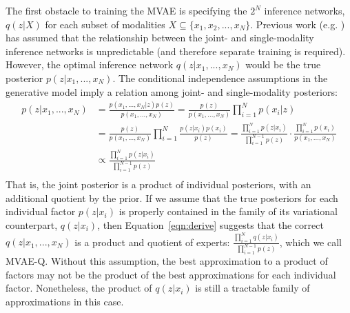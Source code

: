 The first obstacle to training the MVAE is specifying the $2^N$ inference networks, $q(z|X)$ for each subset of modalities $X \subseteq \{x_1, x_2, ..., x_N\}$.
Previous work (e.g. \cite{suzuki2016joint, vedantam2017generative}) has assumed that the relationship between the joint- and single-modality inference networks is unpredictable (and therefore separate training is required).
However, the optimal inference network $q(z|x_1, ..., x_N)$ would be the true posterior $p(z|x_1, ..., x_N)$.
The conditional independence assumptions in the generative model imply a relation among joint- and single-modality posteriors:
\begin{equation}
\begin{aligned}
p(z|x_1, ..., x_N) & = \frac{p(x_1, ..., x_N|z)p(z)}{p(x_1, ..., x_N)} =  \frac{p(z)}{p(x_1, ..., x_N)}\prod_{i=1}^{N} p(x_i|z) \\
& = \frac{p(z)}{p(x_1, ..., x_N)}\prod_{i=1}^{N} \frac{p(z|x_i)p(x_i)}{p(z)}
 = \frac{\prod_{i=1}^{N}p(z|x_i)}{\prod_{i=1}^{N-1}p(z)} \cdot \frac{\prod_{i=1}^{N} p(x_i)}{p(x_1, ..., x_N)} \\
 &\propto \frac{\prod_{i=1}^{N}p(z|x_i)}{\prod_{i=1}^{N-1}p(z)} \\
\end{aligned}
\label{eqn:derive}
\end{equation}
That is, the joint posterior is a product of individual posteriors, with an additional quotient by the prior. If we assume that the true posteriors for each individual factor $p(z|x_i)$ is properly contained in the family of its variational counterpart, $q(z|x_i)$, then Equation~\ref{eqn:derive} suggests that the correct $q(z|x_1, ..., x_N)$ is a product and quotient of experts: $\frac{\prod_{i=1}^{N}q(z|x_i)}{\prod_{i=1}^{N-1}p(z)}$, which we call MVAE-Q. Without this assumption, the best approximation to a product of factors may not be the product of the best approximations for each individual factor. Nonetheless, the product of $q(z|x_i)$ is still a tractable family of approximations in this case.

